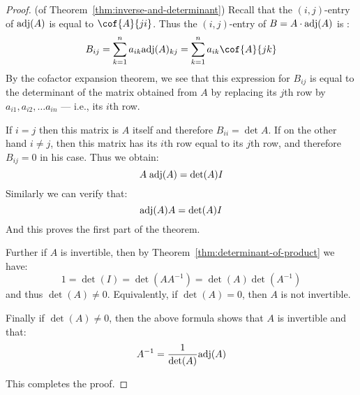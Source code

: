 \begin{proof} (of Theorem~\ref{thm:inverse-and-determinant})
Recall that the $(i,j)$-entry of $\mbox{\rm adj}(A)$ is equal to $\cof{A}{ji}$.  Thus the $(i,j)$-entry of   $B=A\cdot \mbox{\rm adj}(A)$ is : 
\[
B_{ij}=\sum_{k=1}^n a_{ik} \func{adj} (A)_{kj}= \sum_{k=1}^n a_{ik} \cof{A}{jk}
\]
By the cofactor expansion theorem, we see that this expression for $B_{ij}$ is equal to the determinant of the
matrix obtained from $A$ by replacing its $j$th  row  by $a_{i1}, a_{i2}, \dots a_{in}$ --- i.e., its $i$th row. 

If $i=j$ then this matrix is $A$ itself and therefore $B_{ii}=\det
A$. If on the other hand $i\neq j$, then this matrix has its $i$th row
equal to its $j$th row, and therefore $B_{ij}=0$ in his case. Thus we obtain: 
\begin{equation*}
A \; \mbox{\rm adj}(A) = {\det (A)} I
\end{equation*}
Similarly we can verify that:
\begin{equation*}
\mbox{\rm adj}(A)A = {\det (A)} I
\end{equation*}
And this proves the first part of the theorem. 

Further if $A$ is  invertible, then by Theorem~\ref{thm:determinant-of-product} we have:
\[ 1 = \det (I) = \det (A A^{-1}) = \det (A) \det (A^{-1}) \]
and thus $\det (A) \neq 0$. Equivalently, if  $\det (A) = 0$, then $A$ is not invertible. 

Finally if $\det (A) \neq 0$, then the above formula shows that $A$ is invertible and that:
\begin{equation*}
A^{-1} = \frac{1}{\det (A)} \mbox{\rm adj}(A)
\end{equation*}

This completes the proof.
\end{proof}


